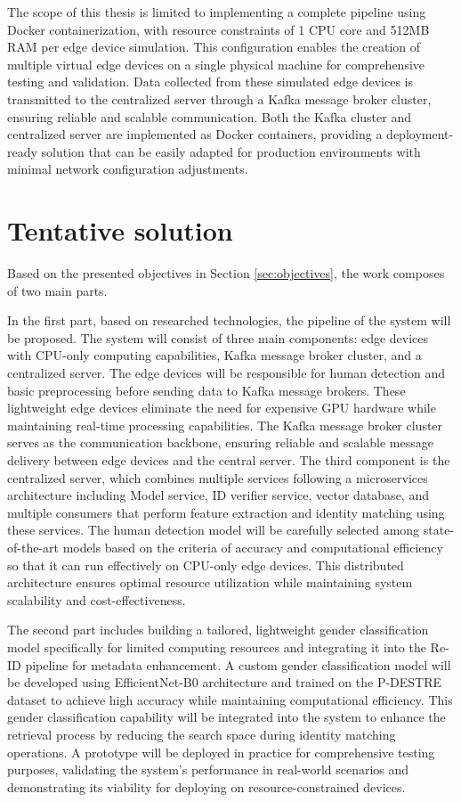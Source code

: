 \documentclass[../main.tex]{subfiles}
\begin{document}
The scope of this thesis is limited to implementing a complete pipeline using Docker containerization, with resource constraints of 1 CPU core and 512MB RAM per edge device simulation. This configuration enables the creation of multiple virtual edge devices on a single physical machine for comprehensive testing and validation. Data collected from these simulated edge devices is transmitted to the centralized server through a Kafka message broker cluster, ensuring reliable and scalable communication. Both the Kafka cluster and centralized server are implemented as Docker containers, providing a deployment-ready solution that can be easily adapted for production environments with minimal network configuration adjustments.


\section{Tentative solution} 
\label{sec:tentative_solution}

Based on the presented objectives in Section \ref{sec:objectives}, the work composes of two main parts.

In the first part, based on researched technologies, the pipeline of the system will be proposed. The system will consist of three main components: edge devices with CPU-only computing capabilities, Kafka message broker cluster, and a centralized server. The edge devices will be responsible for human detection and basic preprocessing before sending data to Kafka message brokers. These lightweight edge devices eliminate the need for expensive GPU hardware while maintaining real-time processing capabilities. The Kafka message broker cluster serves as the communication backbone, ensuring reliable and scalable message delivery between edge devices and the central server. The third component is the centralized server, which combines multiple services following a microservices architecture including Model service, ID verifier service, vector database, and multiple consumers that perform feature extraction and identity matching using these services. The human detection model will be carefully selected among state-of-the-art models based on the criteria of accuracy and computational efficiency so that it can run effectively on CPU-only edge devices. This distributed architecture ensures optimal resource utilization while maintaining system scalability and cost-effectiveness.

The second part includes building a tailored, lightweight gender classification model specifically for limited computing resources and integrating it into the Re-ID pipeline for metadata enhancement. A custom gender classification model will be developed using EfficientNet-B0 architecture and trained on the P-DESTRE dataset to achieve high accuracy while maintaining computational efficiency. This gender classification capability will be integrated into the system to enhance the retrieval process by reducing the search space during identity matching operations. A prototype will be deployed in practice for comprehensive testing purposes, validating the system's performance in real-world scenarios and demonstrating its viability for deploying on resource-constrained devices.
\end{document}
